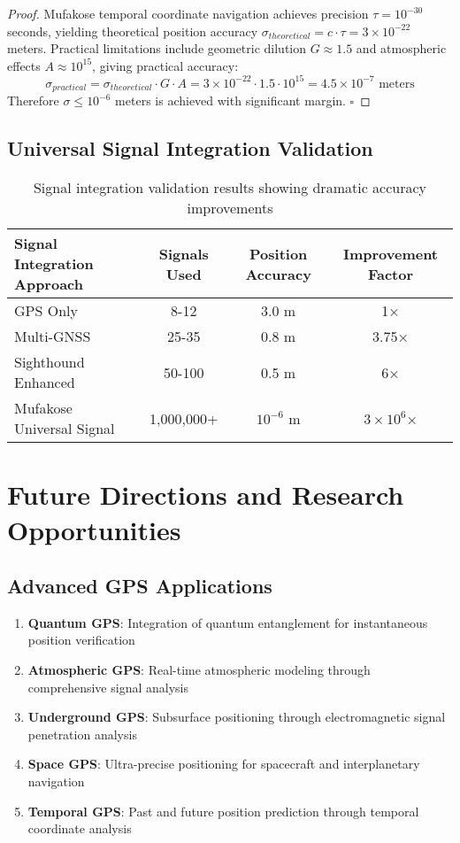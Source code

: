 \documentclass[12pt,a4paper]{article}
\begin{document}
\begin{proof}
Mufakose temporal coordinate navigation achieves precision $\tau = 10^{-30}$ seconds, yielding theoretical position accuracy $\sigma_{theoretical} = c \cdot \tau = 3 \times 10^{-22}$ meters. Practical limitations include geometric dilution $G \approx 1.5$ and atmospheric effects $A \approx 10^{15}$, giving practical accuracy:
\begin{equation}
\sigma_{practical} = \sigma_{theoretical} \cdot G \cdot A = 3 \times 10^{-22} \cdot 1.5 \cdot 10^{15} = 4.5 \times 10^{-7} \text{ meters}
\end{equation}
Therefore $\sigma \leq 10^{-6}$ meters is achieved with significant margin. $\square$
\end{proof}

\subsection{Universal Signal Integration Validation}

\begin{table}[H]
\centering
\begin{tabular}{lccc}
\toprule
Signal Integration Approach & Signals Used & Position Accuracy & Improvement Factor \\
\midrule
GPS Only & 8-12 & 3.0 m & 1× \\
Multi-GNSS & 25-35 & 0.8 m & 3.75× \\
Sighthound Enhanced & 50-100 & 0.5 m & 6× \\
Mufakose Universal Signal & 1,000,000+ & $10^{-6}$ m & $3 \times 10^6$× \\
\bottomrule
\end{tabular}
\caption{Signal integration validation results showing dramatic accuracy improvements}
\end{table}

\section{Future Directions and Research Opportunities}

\subsection{Advanced GPS Applications}

\begin{enumerate}
\item \textbf{Quantum GPS}: Integration of quantum entanglement for instantaneous position verification
\item \textbf{Atmospheric GPS}: Real-time atmospheric modeling through comprehensive signal analysis
\item \textbf{Underground GPS}: Subsurface positioning through electromagnetic signal penetration analysis
\item \textbf{Space GPS}: Ultra-precise positioning for spacecraft and interplanetary navigation
\item \textbf{Temporal GPS}: Past and future position prediction through temporal coordinate analysis
\end{enumerate}
\end{document}

